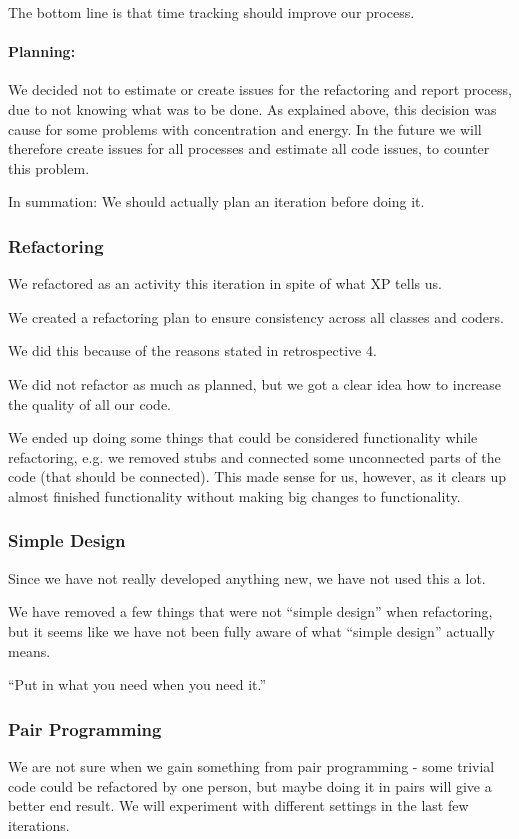 The bottom line is that time tracking should improve our process.


\paragraph{Planning:}
We decided not to estimate or create issues for the refactoring and report process, due to not knowing what was to be done.\linebreak
As explained above, this decision was cause for some problems with concentration and energy.
In the future we will therefore create issues for all processes and estimate all code issues, to counter this problem.

In summation: We should actually plan an iteration before doing it.


\subsubsection{Refactoring}
We refactored as an activity this iteration in spite of what XP tells us.

We created a refactoring plan to ensure consistency across all classes and coders.

We did this because of the reasons stated in retrospective 4.

We did not refactor as much as planned, but we got a clear idea how to increase the quality of all our code.

We ended up doing some things that could be considered functionality while refactoring, e.g. we removed stubs and connected some unconnected parts of the code (that should be connected). This made sense for us, however, as it clears up almost finished functionality without making big changes to functionality.

\subsubsection{Simple Design}
Since we have not really developed anything new, we have not used this a lot.

We have removed a few things that were not “simple design” when refactoring, but it seems like we have not been fully aware of what “simple design” actually means.

“Put in what you need when you need it.”

\subsubsection{Pair Programming}
We are not sure when we gain something from pair programming - some trivial code could be refactored by one person, but maybe doing it in pairs will give a better end result. We will experiment with different settings in the last few iterations.

